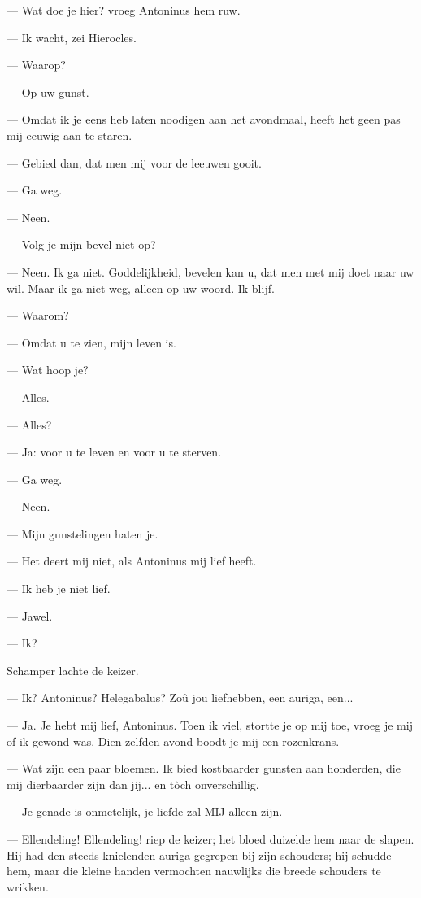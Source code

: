 \documentclass[a4paper, 12pt, oneside, dutch]{article}
\begin{document}
--- Wat doe je hier? vroeg Antoninus hem ruw.

--- Ik wacht, zei Hierocles.

--- Waarop?

--- Op uw gunst.

--- Omdat ik je eens heb laten noodigen aan het avondmaal, heeft het geen pas mij eeuwig aan te staren.

--- Gebied dan, dat men mij voor de leeuwen gooit.

--- Ga weg.

--- Neen.

--- Volg je mijn bevel niet op?

--- Neen. Ik ga niet. Goddelijkheid, bevelen kan u, dat men met mij doet naar uw wil. Maar ik ga niet weg, alleen op uw woord. Ik blijf.

--- Waarom?

--- Omdat u te zien, mijn leven is.

--- Wat hoop je?

--- Alles.

--- Alles?

--- Ja: voor u te leven en voor u te sterven.

--- Ga weg.

--- Neen.

--- Mijn gunstelingen haten je.

--- Het deert mij niet, als Antoninus mij lief heeft.

--- Ik heb je niet lief.

--- Jawel.

--- Ik?

Schamper lachte de keizer.

--- Ik? Antoninus? Helegabalus? Zoû jou liefhebben, een auriga, een...

--- Ja. Je hebt mij lief, Antoninus. Toen ik viel, stortte je op mij toe, vroeg je mij of ik gewond was. Dien zelfden avond boodt je mij een rozenkrans.

--- Wat zijn een paar bloemen. Ik bied kostbaarder gunsten aan honderden, die mij dierbaarder zijn dan jij... en tòch onverschillig.

--- Je genade is onmetelijk, je liefde zal MIJ alleen zijn.

--- Ellendeling! Ellendeling! riep de keizer; het bloed duizelde hem naar de slapen. Hij had den steeds knielenden auriga gegrepen bij zijn schouders; hij schudde hem, maar die kleine handen vermochten nauwlijks die breede schouders te wrikken.
\end{document}
